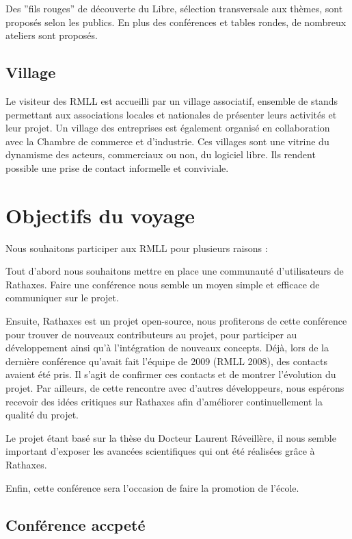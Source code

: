 \documentclass{rtxreport}
\begin{document}
Des ''fils rouges'' de découverte du Libre, sélection transversale aux thèmes, sont proposés selon les publics. En plus des conférences et tables rondes, de nombreux ateliers sont proposés.

\section{Village}

Le visiteur des RMLL est accueilli par un village associatif, ensemble de stands permettant aux associations locales et nationales de présenter leurs activités et leur projet. Un village des entreprises est également organisé en collaboration avec la Chambre de commerce et d'industrie. Ces villages sont une vitrine du dynamisme des acteurs, commerciaux ou non, du logiciel libre. Ils rendent possible une prise de contact informelle et conviviale.


\chapter{Objectifs du voyage}
Nous souhaitons participer aux RMLL pour plusieurs raisons :

Tout d'abord nous souhaitons mettre en place une communauté d'utilisateurs de Rathaxes. Faire une conférence nous semble un moyen simple et efficace de communiquer sur le projet.

Ensuite, Rathaxes est un projet open-source, nous profiterons de cette conférence pour trouver de nouveaux contributeurs au projet, pour participer au développement ainsi qu’à l’intégration de nouveaux concepts.
Déjà, lors de la dernière conférence qu'avait fait l'équipe de 2009 (RMLL 2008), des contacts avaient été pris. Il s'agit de confirmer ces contacts et de montrer l'évolution du projet.
Par ailleurs, de cette rencontre avec d'autres développeurs, nous espérons recevoir des idées critiques sur Rathaxes afin d'améliorer continuellement la qualité du projet.

Le projet étant basé sur la thèse du Docteur Laurent Réveillère, il nous semble important d'exposer les avancées scientifiques qui ont été réalisées grâce à Rathaxes.

Enfin, cette conférence sera l'occasion de faire la promotion de l'école.


\section{Conférence accpeté}
\end{document}
